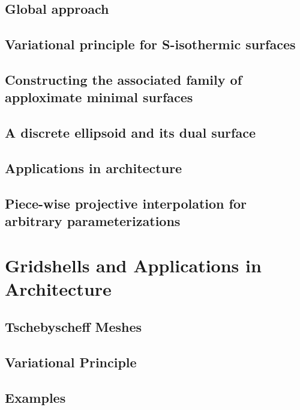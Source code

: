 \documentclass{book}
\begin{document}
\subsection{Global approach}
\subsection{Variational principle for S-isothermic surfaces}
\subsection{Constructing the associated family of apploximate minimal surfaces}
\subsection{A discrete ellipsoid and its dual surface}
\subsection{Applications in architecture}
\subsection{Piece-wise projective interpolation for arbitrary parameterizations}

\section{Gridshells and Applications in Architecture}
\subsection{Tschebyscheff Meshes}
\subsection{Variational Principle}
\subsection{Examples}

\newpage
\backmatter 

\setcounter{secnumdepth}{-1} 

\end{document}
